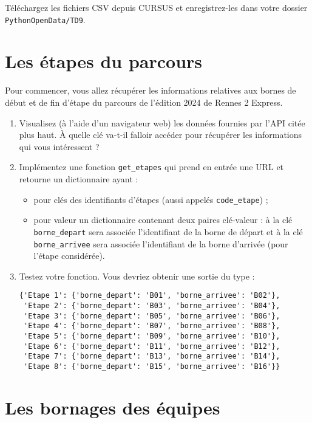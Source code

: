 \documentclass[11pt,a4paper]{article}
\begin{document}
Téléchargez les fichiers CSV depuis CURSUS et enregistrez-les dans votre dossier \texttt{PythonOpenData/TD9}.

\section{Les étapes du parcours}

Pour commencer, vous allez récupérer les informations relatives aux bornes de début et de fin d'étape du parcours de l'édition 2024 de Rennes 2 Express.

\begin{enumerate}
    \item Visualisez (à l'aide d'un navigateur web) les données fournies par l'API citée plus haut. À quelle clé va-t-il falloir accéder pour récupérer les informations qui vous intéressent ?
    \item Implémentez une fonction \texttt{get\_etapes} qui prend en entrée une URL et retourne un dictionnaire ayant :
    \begin{itemize}
        \item pour clés des identifiants d'étapes (aussi appelés \texttt{code\_etape}) ;
        \item pour valeur un dictionnaire contenant deux paires clé-valeur : à la clé \texttt{borne\_depart} sera associée l'identifiant de la borne de départ et à la clé \texttt{borne\_arrivee} sera associée l'identifiant de la borne d'arrivée (pour l'étape considérée).
    \end{itemize}
    \item Testez votre fonction. Vous devriez obtenir une sortie du type :
    \begin{verbatim}
{'Etape 1': {'borne_depart': 'B01', 'borne_arrivee': 'B02'},
 'Etape 2': {'borne_depart': 'B03', 'borne_arrivee': 'B04'},
 'Etape 3': {'borne_depart': 'B05', 'borne_arrivee': 'B06'},
 'Etape 4': {'borne_depart': 'B07', 'borne_arrivee': 'B08'},
 'Etape 5': {'borne_depart': 'B09', 'borne_arrivee': 'B10'},
 'Etape 6': {'borne_depart': 'B11', 'borne_arrivee': 'B12'},
 'Etape 7': {'borne_depart': 'B13', 'borne_arrivee': 'B14'},
 'Etape 8': {'borne_depart': 'B15', 'borne_arrivee': 'B16'}}
    \end{verbatim}
\end{enumerate}

\section{Les bornages des équipes}
\end{document}
